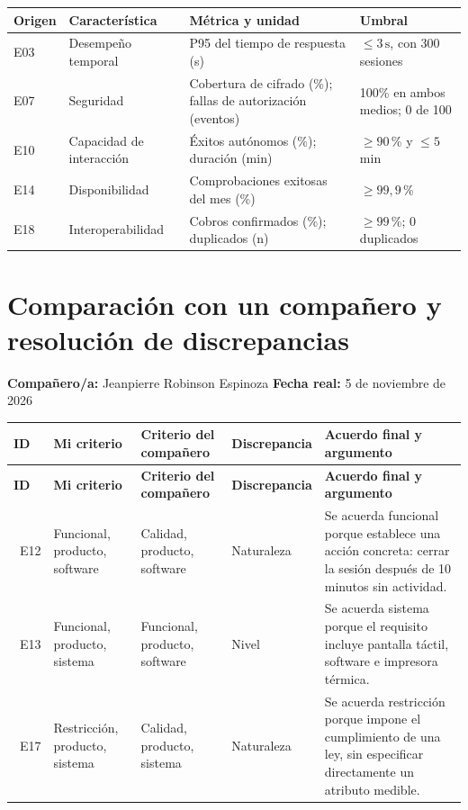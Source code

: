 \documentclass[11pt,a4paper]{article}
\begin{document}
\begin{center}
\begin{tabularx}{\textwidth}{@{}P{1.43cm}P{3.0cm}P{4.93cm}X@{}}
\toprule{}
\color{white}\textbf{Origen} & \color{white}\textbf{Característica} & \color{white}\textbf{Métrica y unidad} & \color{white}\textbf{Umbral}\\\midrule
E03 & Desempeño temporal & P95 del tiempo de respuesta (s) & \(\leq 3\,\mathrm{s}\), con 300 sesiones\\
E07 & Seguridad & Cobertura de cifrado (\%); fallas de autorización (eventos) & 100\% en ambos medios; 0 de 100\\
E10 & Capacidad de interacción & Éxitos autónomos (\%); duración (min) & \(\geq90\)\,\% y \(\leq5\) min\\
E14 & Disponibilidad & Comprobaciones exitosas del mes (\%) & \(\geq99{,}9\)\,\%\\
E18 & Interoperabilidad & Cobros confirmados (\%); duplicados (n) & \(\geq99\)\,\%; 0 duplicados\\
\bottomrule
\end{tabularx}
\end{center}

\section{Comparación con un compañero y resolución de discrepancias}


\textbf{Compañero/a:} Jeanpierre Robinson Espinoza \hfill \textbf{Fecha real:} 5 de noviembre de 2026

{\small
\begin{longtable}{@{}P{0.8cm}P{2.9cm}P{2.9cm}P{2.5cm}P{6.0cm}@{}}
\toprule {}
\color{white}\textbf{ID} & \color{white}\textbf{Mi criterio} & \color{white}\textbf{Criterio del compañero} & \color{white}\textbf{Discrepancia} & \color{white}\textbf{Acuerdo final y argumento}\\\midrule\endfirsthead
\toprule {}\color{white}\textbf{ID} & \color{white}\textbf{Mi criterio} & \color{white}\textbf{Criterio del compañero} & \color{white}\textbf{Discrepancia} & \color{white}\textbf{Acuerdo final y argumento}\\\midrule\endhead
\bottomrule\endfoot
\ E12  & Funcional, producto, software & Calidad, producto, software & Naturaleza & Se acuerda funcional porque establece una acción concreta: cerrar la sesión después de 10 minutos sin actividad.\\[1.0cm]
\ E13  & Funcional, producto, sistema & Funcional, producto, software & Nivel & Se acuerda sistema porque el requisito incluye pantalla táctil, software e impresora térmica.\\[1.0cm]
\ E17  & Restricción, producto, sistema & Calidad, producto, sistema & Naturaleza & Se acuerda restricción porque impone el cumplimiento de una ley, sin especificar directamente un atributo medible.\\[1.0cm]
\end{longtable}
}
\end{document}

